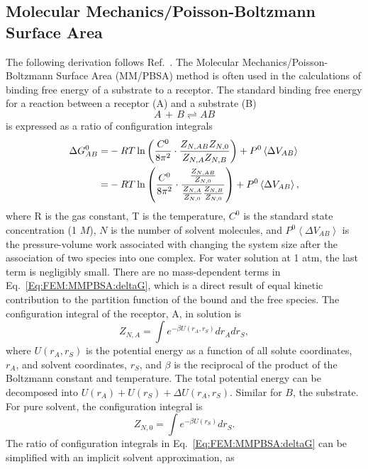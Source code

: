 \subsection{Molecular Mechanics/Poisson-Boltzmann Surface Area\label{Sec:FEM:MMPBSA}}
The following derivation follows Ref.~\cite{SwansonBJ2004}.
The Molecular Mechanics/Poisson-Boltzmann Surface Area (MM/PBSA) method is often used in the calculations of binding free energy of a substrate to a receptor.
The standard binding free energy for a reaction between a receptor (A) and a substrate (B)
\begin{equation}
	A\,+\,B\rightleftharpoons AB
\end{equation}
is expressed as a ratio of configuration integrals
\begin{align}
	\Delta G_{AB}^0 =& -RT\ln{\left(\frac{C^0}{8\pi^2}\cdot\frac{Z_{N,AB}Z_{N,0}}{Z_{N,A}Z_{N,B}}\right)}+P^0\left<\Delta V_{AB}\right>\notag\\
	                =& -RT\ln{\left(\frac{C^0}{8\pi^2}\cdot\frac{\frac{Z_{N,AB}}{Z_{N,0}}}{\frac{Z_{N,A}}{Z_{N,0}}\frac{Z_{N,B}}{Z_{N,0}}}\right)}+P^0\left<\Delta V_{AB}\right>,
	\label{Eq:FEM:MMPBSA:deltaG}
\end{align}
where R is the gas constant, T is the temperature, $C^0$ is the standard state concentration (1 $M$), $N$ is the number of solvent molecules, and $P^0\left<\Delta V_{AB}\right>$ is the pressure-volume work associated with changing the system size after the association of two species into one complex. For water solution at 1 atm, the last term is negligibly small. There are no mass-dependent terms in Eq.~\ref{Eq:FEM:MMPBSA:deltaG}, which is a direct result of equal kinetic contribution to the partition function of the bound and the free species. The configuration integral of the receptor, A, in solution is
\begin{equation}
	Z_{N,A}=\int e^{-\beta U(r_A,r_S)}dr_Adr_S,
\end{equation}
where $U(r_A,r_S)$ is the potential energy as a function of all solute coordinates, $r_A$, and solvent coordinates, $r_S$, and $\beta$ is the reciprocal of the product of the Boltzmann constant and temperature. The total potential energy can be decomposed into $U(r_A)+U(r_S)+\Delta U(r_A,r_S)$. Similar for $B$, the substrate. For pure solvent, the configuration integral is
\begin{equation}
	Z_{N,0}=\int e^{-\beta U(r_S)}dr_S.
\end{equation}
The ratio of configuration integrals in Eq.~\ref{Eq:FEM:MMPBSA:deltaG} can be simplified with an implicit solvent approximation, as
